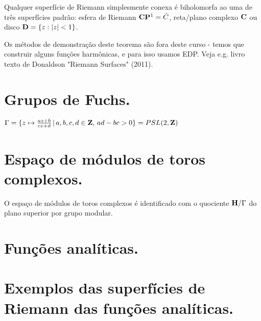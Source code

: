 \begin{teorema}
Qualquer superfície de Riemann simplesmente conexa é biholomorfa ao uma de três superfícies padrão:
esfera de Riemann $\mathbf{C}\mathbf{P}^1 = \bar{C}$, reta/plano complexo $\mathbf{C}$ ou disco $\mathbf{D} = \{z : |z|<1\}$.
\end{teorema}
Os métodos de demonstração deste teorema são fora deste curso - temos que construir alguns funções
harmônicas, e para isso usamos EDP. Veja e.g. livro texto de Donaldson "Riemann Surfaces" (2011).

\section{Grupos de Fuchs.}

\begin{exem}
$\Gamma = \{ z \mapsto \frac{az+b}{cz+d} \,|\, a,b,c,d\in\mathbf{Z}, \, ad-bc>0 \} = PSL(2,\mathbf{Z})$
\end{exem}

\section{Espaço de módulos de toros complexos.}

\begin{teorema}
O espaço de módulos de toros complexos é identificado com o quociente $\mathbf{H}/\Gamma$
do plano superior por grupo modular.
\end{teorema}

\section{Funções analíticas.}

\section{Exemplos das superfícies de Riemann das funções analíticas.}
